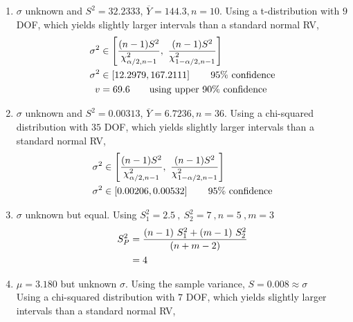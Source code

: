 \begin{enumerate}
	\item  $ \sigma $ unknown and $ S^2 = 32.2333 $, $ \overline{Y} = 144.3, n = 10$. Using a t-distribution with $ 9 $ DOF, which yields slightly larger intervals than a standard normal RV,\\
	\begin{subequations}
		\begin{align}
			\sigma^2 &\in \left[\frac{(n-1)S^2}{\chi^2_{\alpha/2, n-1}} ,\  \frac{(n-1)S^2}{\chi^2_{1 -\alpha/2, n-1}} \right] \nonumber \\
			\sigma^2 &\in \left[ 12.2979, 167.2111 \right] \qquad \text{95\% confidence} \nonumber \\
			v &= 69.6 \qquad \text{using upper 90\% confidence}
		\end{align}\\
	\end{subequations}
	
	\item  $ \sigma $ unknown and $ S^2 = 0.00313 $, $ \overline{Y} = 6.7236, n = 36$. Using a chi-squared distribution with $ 35 $ DOF, which yields slightly larger intervals than a standard normal RV,\\
	\begin{subequations}
		\begin{align}
			\sigma^2 &\in \left[\frac{(n-1)S^2}{\chi^2_{\alpha/2, n-1}} ,\  \frac{(n-1)S^2}{\chi^2_{1 -\alpha/2, n-1}} \right] \nonumber \\
			\sigma^2 &\in \left[ 0.00206, 0.00532 \right] \qquad \text{95\% confidence} 
		\end{align}\\
	\end{subequations}

	\item  $ \sigma $ unknown but equal. Using $ S_1^2 = 2.5\ ,\ S_2^2 = 7\ , n = 5\ , m = 3 $\\
	\begin{subequations}
		\begin{align}
			S_P^2 &= \frac{(n-1)\ S_1^2 + (m-1)\ S_2^2}{(n+m-2)} \nonumber \\
			&= 4
		\end{align}\\
	\end{subequations}

	\item  $ \mu = 3.180 $ but unknown $ \sigma $. Using the sample variance, $ S = 0.008 \approx \sigma $\\
	Using a chi-squared distribution with $ 7 $ DOF, which yields slightly larger intervals than a standard normal RV,\\
	

\end{enumerate}
